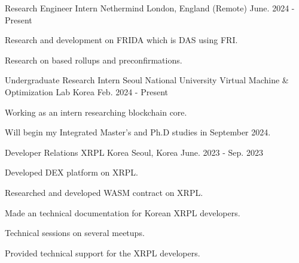 


\begin{cventries}


\cventry
{Research Engineer Intern} %
{Nethermind} %
{London, England (Remote)} %
{June. 2024 - Present} %
{ %
\begin{cvitems}
\item {Research and development on FRIDA which is DAS using FRI.}
\item {Research on based rollups and preconfirmations.}
\end{cvitems}
}


\cventry
{Undergraduate Research Intern} %
{Seoul National University Virtual Machine \& Optimization Lab} %
{Korea} %
{Feb. 2024 - Present} %
{ %
\begin{cvitems}
\item {Working as an intern researching blockchain core.}
\item {Will begin my Integrated Master's and Ph.D studies in September 2024.}
\end{cvitems}
}


\cventry
{Developer Relations} %
{XRPL Korea} %
{Seoul, Korea} %
{June. 2023 - Sep. 2023} %
{ %
\begin{cvitems}
\item {Developed DEX platform on XRPL.}
\item {Researched and developed WASM contract on XRPL.}
\item {Made an technical documentation for Korean XRPL developers.}
\item {Technical sessions on several meetups.}
\item {Provided technical support for the XRPL developers.}
\end{cvitems}
}


\end{cventries}

